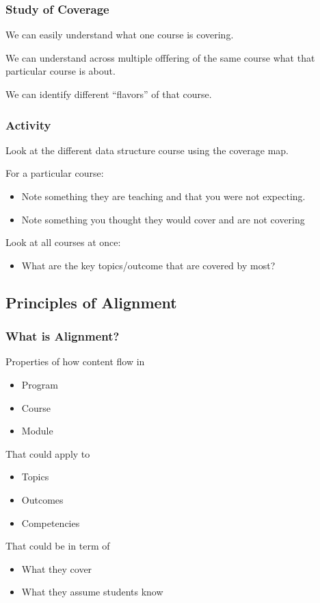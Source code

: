 \documentclass[aspectratio=169]{beamer}
\begin{document}
\begin{frame}
  \frametitle{Study of Coverage}

  We can easily understand what one course is covering.

  We can understand across multiple offfering of the same course what that particular course is about.

  We can identify different ``flavors'' of that course.  
\end{frame}

\begin{frame}
  \frametitle{Activity}

  Look at the different data structure course using the coverage map.

  For a particular course:
  \begin{itemize}
  \item Note something they are teaching and that you were not expecting.
  \item Note something you thought they would cover and are not covering
  \end{itemize}

  Look at all courses at once:
  \begin{itemize}
  \item What are the key topics/outcome that are covered by most?
  \end{itemize}
\end{frame}

\subsection{Principles of Alignment}

\begin{frame}
  \frametitle{What is Alignment?}

  \begin{block}{Properties of how content flow in}
    \begin{itemize}
    \item Program
    \item Course
    \item Module
    \end{itemize}
  \end{block}

  \begin{block}{That could apply to}
    \begin{itemize}
    \item Topics
    \item Outcomes
    \item Competencies
    \end{itemize}
  \end{block}

  \begin{block}{That could be in term of}
    \begin{itemize}
    \item What they cover
    \item What they assume students know
    \end{itemize}
  \end{block}
  
\end{frame}
\end{document}
